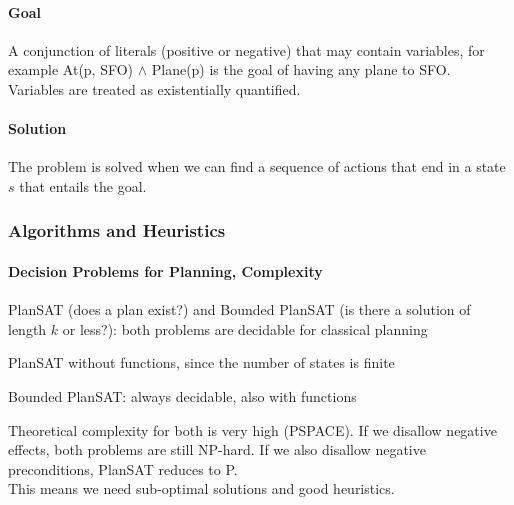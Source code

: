 \documentclass[10pt]{report}
\begin{document}
\paragraph{Goal} A conjunction of literals (positive or negative) that may contain variables, for example At(p, SFO) $\wedge$ Plane(p) is the goal of having any plane to SFO.\\
Variables are treated as existentially quantified.
\paragraph{Solution} The problem is solved when we can find a sequence of actions that end in a state $s$ that entails the goal.
\subsubsection{Algorithms and Heuristics}
\paragraph{Decision Problems for Planning, Complexity} PlanSAT (does a plan exist?) and Bounded PlanSAT (is there a solution of length $k$ or less?): both problems are decidable for classical planning\begin{list}{}{}
	\item PlanSAT without functions, since the number of states is finite
	\item Bounded PlanSAT: always decidable, also with functions
\end{list}
Theoretical complexity for both is very high (PSPACE). If we disallow negative effects, both problems are still NP-hard. If we also disallow negative preconditions, PlanSAT reduces to P.\\
This means we need sub-optimal solutions and good heuristics.
\end{document}
